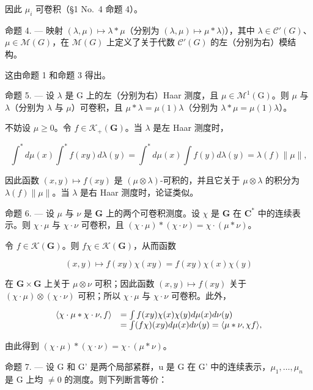 因此 \(\mu_{i}\) 可卷积（§1 No.~4 命题 4）。

命题 4. --- 映射 \((\lambda, \mu) \mapsto \lambda * \mu\)（分别为 \((\lambda, \mu) \mapsto \mu * \lambda)\)），其中 \(\lambda \in \mathcal{C}'(G)\)、\(\mu \in \mathcal{M}(G)\)，在 \(\mathcal{M}(G)\) 上定义了关于代数 \(\mathcal{C}'(G)\) 的左（分别为右）模结构。

这由命题 1 和命题 3 得出。

命题 5. --- 设 \(\lambda\) 是 G 上的左（分别为右）Haar 测度，且 \(\mu \in \mathcal{M}^1(\mathrm{G})\)。则 \(\mu\) 与 \(\lambda\)（分别为 \(\lambda\) 与 \(\mu\)）可卷积，且 \(\mu * \lambda = \mu(1)\lambda\)（分别为 \(\lambda * \mu = \mu(1)\lambda\)）。

不妨设 \(\mu \geqslant 0\)。令 \(f \in \mathcal{K}_{+}(\mathbf{G})\)。当 \(\lambda\) 是左 Haar 测度时，

\[
\int^ {*} d \mu (x) \int^ {*} f (x y) d \lambda (y) = \int^ {*} d \mu (x) \int f (y) d \lambda (y) = \lambda (f) \| \mu \|,
\]

因此函数 \((x,y)\mapsto f(xy)\) 是 \((\mu \otimes \lambda)\)-可积的，并且它关于 \(\mu \otimes \lambda\) 的积分为 \(\lambda (f)\| \mu \|\)。当 \(\lambda\) 是右 Haar 测度时，论证类似。

命题 6. --- 设 \(\mu\) 与 \(\nu\) 是 \(\mathbf{G}\) 上的两个可卷积测度。设 \(\chi\) 是 \(\mathbf{G}\) 在 \(\mathbf{C}^*\) 中的连续表示。则 \(\chi \cdot \mu\) 与 \(\chi \cdot \nu\) 可卷积，且 \((\chi \cdot \mu) * (\chi \cdot \nu) = \chi \cdot (\mu * \nu)\)。

令 \(f \in \mathcal{K}(\mathbf{G})\)。则 \(f\chi \in \mathcal{K}(\mathbf{G})\)，从而函数

\[
(x, y) \mapsto f (x y) \chi (x y) = f (x y) \chi (x) \chi (y)
\]

在 \(\mathbf{G} \times \mathbf{G}\) 上关于 \(\mu \otimes \nu\) 可积；因此函数 \((x, y) \mapsto f(xy)\) 关于 \((\chi \cdot \mu) \otimes (\chi \cdot \nu)\) 可积；所以 \(\chi \cdot \mu\) 与 \(\chi \cdot \nu\) 可卷积。此外，

\[
\begin{array}{r l} \langle \chi \cdot \mu * \chi \cdot \nu , f \rangle & = \int f (x y) \chi (x) \chi (y) d \mu (x) d \nu (y) \\ & = \int (f \chi) (x y) d \mu (x) d \nu (y) = \langle \mu * \nu , \chi f \rangle , \end{array}
\]

由此得到 \((\chi \cdot \mu) * (\chi \cdot \nu) = \chi \cdot (\mu * \nu)\)。

命题 7. --- 设 G 和 G' 是两个局部紧群，u 是 G 在 G' 中的连续表示，\(\mu_{1},\ldots,\mu_{n}\) 是 G 上均 \(\neq0\) 的测度。则下列断言等价：

